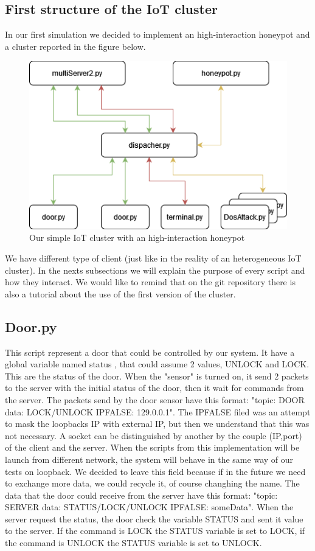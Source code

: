 \subsection{ First structure of the IoT cluster}
In our first simulation we decided to implement an high-interaction honeypot and a cluster reported in the figure below.
\begin{figure}[h!]
  \centering
  \includegraphics[width = 12cm]{images/HighInterationHoneypot.drawio.png}
  \caption{Our simple IoT cluster with an high-interaction honeypot}
  \label{fig:DosImpl1}
\end{figure}
\FloatBarrier
\noindent
We have different type of client (just like in the reality of an heterogeneous IoT cluster).
In the nexts subsections we will explain the purpose of every script and how they interact. We would like to remind that on the git repository there is also a tutorial about the use of the first version of the cluster.
\subsection{Door.py}
This script represent a door that could be controlled by our system. It have a global variable named status , that could assume 2 values, UNLOCK and LOCK.
This are the status of the door. When the "sensor" is turned on,  it send 2 packets to the server with the initial status of the door, then it wait for commands from the server.  The packets send by the door sensor have this format: "topic: DOOR data: LOCK/UNLOCK IPFALSE: 129.0.0.1". The IPFALSE filed was an attempt
to mask the loopbacks IP with external IP, but then we understand that this was not necessary. A socket can be distinguished by another by the couple (IP,port) 
of the client and the server. When the scripts from this implementation will be launch from different network, the system will behave in the same way of  our tests on loopback. We decided to leave this field because if in the future we need to exchange more data, we could recycle it, of course changhing the name.
The data that the door could receive from the server have this format: "topic: SERVER data: STATUS/LOCK/UNLOCK IPFALSE: someData". When the server 
request the status, the door check the variable STATUS and sent it value to the server.  If the command is LOCK the STATUS variable is set to LOCK, if the command is UNLOCK the STATUS variable is set to UNLOCK.


